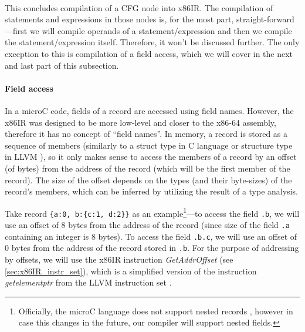 \documentclass[thesis=M,english]{FITthesis}[2019/12/23]
\begin{document}
\paragraph*{} This concludes compilation of a CFG node into x86IR. The compilation of statements and expressions in those nodes is, for the most part, straight-forward---first we will compile operands of a statement/expression and then we compile the statement/expression itself. Therefore, it won't be discussed further. The only exception to this is compilation of a field access, which we will cover in the next and last part of this subsection.

\paragraph*{Field access} In a microC code, fields of a record are accessed using field names. However, the x86IR was designed to be more low-level and closer to the x86-64 assembly, therefore it has no concept of “field names”. In memory, a record is stored as a sequence of members (similarly to a struct type in C language \cite{c_struct} or structure type in LLVM \cite[Structure Type]{llvm}), so it only makes sense to access the members of a record by an offset (of bytes) from the address of the record (which will be the first member of the record). The size of the offset depends on the types (and their byte-sizes) of the record's members, which can be inferred by utilizing the result of a type analysis.

Take record \texttt{\{a:0, b:\{c:1, d:2\}\}} as an example\footnote{Officially, the microC language does not support nested records \cite[Records]{microc}, however in case this changes in the future, our compiler will support nested fields.}---to access the field \texttt{.b}, we will use an offset of 8 bytes from the address of the record (since size of the field \texttt{.a} containing an integer is 8 bytes). To access the field \texttt{.b.c}, we will use an offset of 0 bytes from the address of the record stored in \texttt{.b}. For the purpose of addressing by offsets, we will use the x86IR instruction \emph{GetAddrOffset} (see \autoref{sec:x86IR_instr_set}), which is a simplified version of the instruction \emph{getelementptr} from the LLVM instruction set \cite[getelementptr Instruction]{llvm}.
\end{document}
